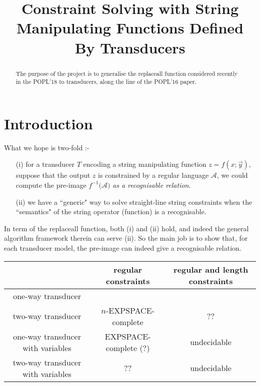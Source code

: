 \documentclass{llncs}
\begin{document}
 

\title{Constraint Solving with String Manipulating Functions Defined By Transducers}

\author{}
\institute{}



	
\maketitle
	
\begin{abstract}
	The purpose of the project is to generalise the replaceall function considered recently in the POPL'18 to transducers, along the line of the POPL'16 paper. 
\end{abstract}

 

\section{Introduction}

What we hope is two-fold :-
\begin{itemize}
	\item[(i)]  for a transducer $T$ encoding a string manipulating function $z=f(x;\vec{y})$, suppose that  the output $z$ is constrained by a regular language $\mathcal{A}$, we could compute the pre-image $f^{-1}(\mathcal{A)}$ \emph{as a recognisable relation}. 
	
	\item[(ii)] we have a ``generic" way to solve straight-line string constraints when the ``semantics" of the string operator (function) is a recognisable. 
\end{itemize}

In term of the replaceall function, both (i) and (ii) hold, and indeed the general algorithm framework therein can serve (ii). So the main job is to show that, for each transducer model, the pre-image can indeed give a recognisable relation. 

\begin{tabular}{|c|c|c|}
	\hline
	
	                					 &  regular constraints    &  regular and length constraints \\
	\hline
	\hline
one-way transducer						 &  \cite{LB16}            &   \cite{LB16}                   \\
two-way transducer						 &  $n$-EXPSPACE-complete  &   ??                            \\
one-way transducer	with variables       &  EXPSPACE-complete (?)  &  undecidable \cite{CCHLW18}     \\
two-way transducer  with variables       &       ??               & undecidable \cite{CCHLW18}     \\
\hline
\end{tabular}
\end{document}
